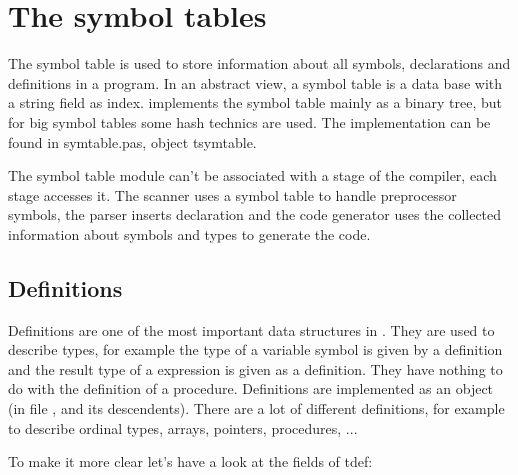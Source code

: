 \documentclass{report}
\begin{document}
\chapter{The symbol tables}
\label{ch:symbol_tables}

The symbol table is used to store information about all
symbols, declarations and definitions in a program.
In an abstract view, a symbol table is a data base with a string field
as index. \fpc implements the symbol table mainly as a binary tree, but
for big symbol tables some hash technics are used. The implementation
can be found in symtable.pas, object tsymtable.

The symbol table module can't be associated with a stage of the compiler,
each stage accesses it.
The scanner uses a symbol table to handle preprocessor symbols, the
parser inserts declaration and the code generator uses the collected
information about symbols and types to generate the code.

\section{Definitions}

Definitions are one of the most important data structures in \fpc.
They are used to describe types, for example the type of a variable
symbol is given by a definition and the result type
of a expression is given as a definition.
They have nothing to do with the definition of a procedure.
Definitions are implemented as an object (in file ,
 and its descendents). There are a lot of different
definitions, for example to describe
ordinal types, arrays, pointers, procedures, ...

To make it more clear let's have a look at the fields of tdef:


\end{document}
